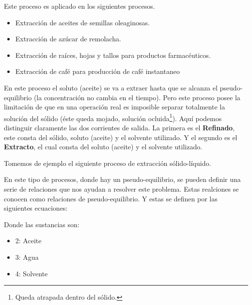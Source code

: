 Este proceso es aplicado en los siguientes procesos.

\begin{itemize}
    \item Extracción de aceites de semillas oleaginosas.
    \item Extracción de azúcar de remolacha.
    \item Extracción de raíces, hojas y tallos para productos farmacéuticos.
    \item Extracción de café para producción de café instantaneo
\end{itemize}

En este proceso el soluto (aceite) se va a extraer hasta que se alcanza el pseudo-equilibrio (la concentración no cambia en el tiempo). Pero este proceso posee la limitación de 
que en una operación real es imposible separar totalmente la solución del sólido (éste queda mojado, solución ocluida\footnote{Queda atrapada dentro del sólido.}). Aquí podemos distinguir claramente las dos corrientes de salida.
La primera es el \textbf{Refinado}, este consta del sólido, soluto (aceite) y el solvente utilizado. Y el segundo es el \textbf{Extracto}, el cual consta del soluto (aceite) y el solvente utilizado.


Tomemos de ejemplo el siguiente proceso de extracción sólido-líquido.

En este tipo de procesos, donde hay un pseudo-equilibrio, se pueden definir una serie de relaciones que nos ayudan a resolver este problema. Estas realciones se conocen como relaciones de pseudo-equilibrio. Y estas se definen por las siguientes ecuaciones:


Donde las sustancias son:
\begin{itemize}
    \item 2: Aceite
    \item 3: Agua
    \item 4: Solvente
\end{itemize}

